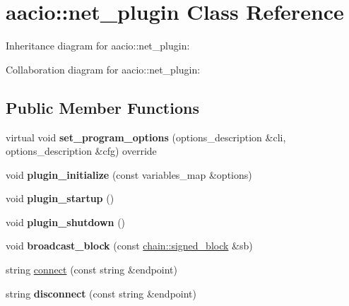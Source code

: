 \hypertarget{classaacio_1_1net__plugin}{}\section{aacio\+:\+:net\+\_\+plugin Class Reference}
\label{classaacio_1_1net__plugin}


Inheritance diagram for aacio\+:\+:net\+\_\+plugin\+:


Collaboration diagram for aacio\+:\+:net\+\_\+plugin\+:
\subsection*{Public Member Functions}
\begin{DoxyCompactItemize}
\item 
\mbox{\label{classaacio_1_1net__plugin_af7122c7ff5ec0d5a62f900e75f2ab152}} 
virtual void {\bfseries set\+\_\+program\+\_\+options} (options\+\_\+description \&cli, options\+\_\+description \&cfg) override
\item 
\mbox{\label{classaacio_1_1net__plugin_a35cbef8ad1bbd64e44d9a09672f5c206}} 
void {\bfseries plugin\+\_\+initialize} (const variables\+\_\+map \&options)
\item 
\mbox{\label{classaacio_1_1net__plugin_a2ac6db4551f2fbacf42b72d71f9bcbb2}} 
void {\bfseries plugin\+\_\+startup} ()
\item 
\mbox{\label{classaacio_1_1net__plugin_a9a4274f04d57a07434e3df9dd58359b4}} 
void {\bfseries plugin\+\_\+shutdown} ()
\item 
\mbox{\label{classaacio_1_1net__plugin_acfd97f8ca4ee4ae755813cbb99de4f6d}} 
void {\bfseries broadcast\+\_\+block} (const \mbox{\hyperlink{structaacio_1_1chain_1_1signed__block}{chain\+::signed\+\_\+block}} \&sb)
\item 
string \mbox{\hyperlink{classaacio_1_1net__plugin_a1aef72e3644635d726c05994125de598}{connect}} (const string \&endpoint)
\item 
\mbox{\label{classaacio_1_1net__plugin_a361d1d7a99efd17dfc594752baf7aeb0}} 
string {\bfseries disconnect} (const string \&endpoint)

\end{DoxyCompactItemize}
